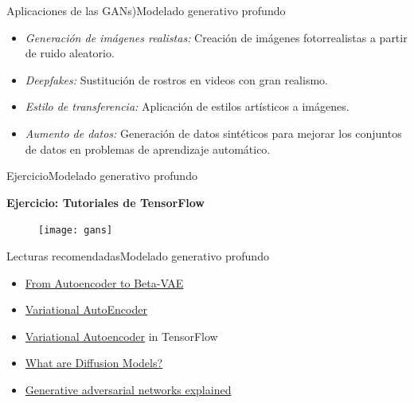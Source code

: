 \documentclass[10pt,border=3pt,tikz]{beamer}
\begin{document}
    \begin{frame}{Aplicaciones de las GANs)}{Modelado generativo profundo}
        \begin{itemize}
            \item \textit{Generación de imágenes realistas:} Creación de imágenes fotorrealistas a partir de ruido aleatorio.
            \item \textit{Deepfakes:} Sustitución de rostros en videos con gran realismo.
            \item \textit{Estilo de transferencia:} Aplicación de estilos artísticos a imágenes.
            \item \textit{Aumento de datos:} Generación de datos sintéticos para mejorar los conjuntos de datos en problemas de aprendizaje automático.
        \end{itemize}
    \end{frame}
    
    \begin{frame}{Ejercicio}{Modelado generativo profundo}
        \begin{center}
            {\Large \textbf{Ejercicio: Tutoriales de TensorFlow}}
        \end{center}
        \begin{figure}
            \centering
            \texttt{[image: gans]}
        \end{figure}
    \end{frame}
    
    \begin{frame}{Lecturas recomendadas}{Modelado generativo profundo}
        \begin{itemize}
            \item \colorbox{blue!10}{\href{https://lilianweng.github.io/posts/2018-08-12-vae/}{From Autoencoder to Beta-VAE}}
            \item \colorbox{blue!10}{\href{https://www.cs.us.es/~fsancho/Blog/posts/VAE.md}{Variational AutoEncoder}}
            \item \colorbox{blue!10}{\href{https://learnopencv.com/variational-autoencoder-in-tensorflow/}{Variational Autoencoder}} in TensorFlow
            \item \colorbox{blue!10}{\href{https://lilianweng.github.io/posts/2021-07-11-diffusion-models/}{What are Diffusion Models?}}
            \item \colorbox{blue!10}{\href{https://developer.ibm.com/articles/generative-adversarial-networks-explained/}{Generative adversarial networks explained
            }}
        \end{itemize}
    \end{frame}
    
\end{document}
